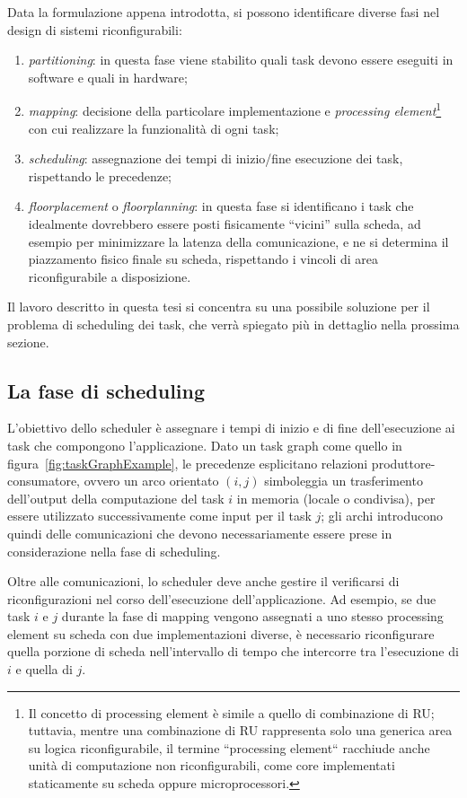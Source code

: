 Data la formulazione appena introdotta, si possono identificare diverse fasi nel
design di sistemi riconfigurabili:
\begin{enumerate}
 \item \emph{partitioning}: in questa fase viene stabilito quali task devono essere
 eseguiti in software e quali in hardware;
 \item \emph{mapping}: decisione della particolare implementazione e \emph{processing
 element}\footnote{Il concetto di processing element è simile a quello di combinazione
 di \ac{RU}; tuttavia, mentre una combinazione di \ac{RU} rappresenta solo una generica
 area su logica riconfigurabile, il termine ``processing element`` racchiude anche unità
 di computazione non riconfigurabili, come core implementati staticamente su scheda oppure
 microprocessori.}
 con cui realizzare la funzionalità di ogni task;
 \item \emph{scheduling}: assegnazione dei tempi di inizio/fine esecuzione dei task,
 rispettando le precedenze;
 \item \emph{floorplacement} o \emph{floorplanning}: in questa fase si identificano i 
task che idealmente dovrebbero essere posti fisicamente ``vicini'' sulla scheda, ad 
esempio per minimizzare la latenza della comunicazione, e ne si determina il piazzamento
fisico finale su scheda, rispettando i vincoli di area riconfigurabile a disposizione.
\end{enumerate}
Il lavoro descritto in questa tesi si concentra su una possibile soluzione per il 
problema di scheduling dei task, che verrà spiegato più in dettaglio nella prossima 
sezione.


\subsection{La fase di scheduling}
\label{subsec:faseSchedulingIntro}
L'obiettivo dello scheduler è assegnare i tempi di inizio e di fine dell'esecuzione ai
task che compongono l'applicazione. Dato un task graph come quello in
figura~\ref{fig:taskGraphExample}, le precedenze esplicitano relazioni produttore-consumatore,
ovvero un arco orientato $(i,j)$ simboleggia un trasferimento dell'output della
computazione del task $i$ in memoria (locale o condivisa), per essere utilizzato
successivamente come input per il task $j$; gli archi introducono quindi delle
comunicazioni che devono necessariamente essere prese in considerazione nella fase 
di scheduling.

Oltre alle comunicazioni, lo scheduler deve anche gestire il verificarsi di 
riconfigurazioni nel corso dell'esecuzione dell'applicazione. Ad esempio, se due task $i$ 
e $j$ durante la fase di mapping vengono assegnati a uno stesso processing element su 
scheda con due implementazioni diverse, è necessario riconfigurare quella porzione di 
scheda nell'intervallo di tempo che intercorre tra l'esecuzione di $i$ e quella di $j$.

